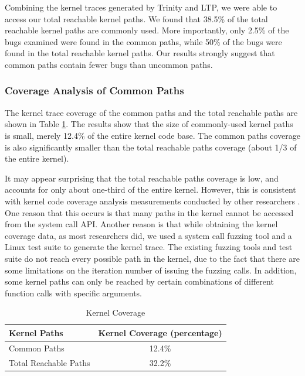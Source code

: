 Combining the kernel traces generated by Trinity and LTP, we were able to
access our total reachable kernel paths.
We found that 38.5\% of the total reachable
kernel paths are commonly used. 
More importantly, only 2.5\% of the bugs examined were found in the common
paths, 
while 50\% of the bugs were found in the total reachable kernel paths. 
Our results strongly suggest that common paths contain fewer bugs than uncommon
paths.  

\subsubsection{Coverage Analysis of Common Paths}

The kernel trace coverage of the common paths and the total reachable paths
are shown in Table \ref{table:kernel_coverage}. 
The results show that the size of commonly-used kernel paths is small,
merely 12.4\% of the entire kernel code base. 
The common paths coverage is also significantly smaller than the total
reachable paths coverage 
(about 1/3 of the entire kernel).

It may appear surprising that the total reachable paths coverage is low, 
and accounts for only about one-third of the entire kernel.  However, 
this is consistent with kernel code coverage analysis 
measurements conducted by other researchers \cite{LTP-Coverage}.
One reason that this occurs is that many paths 
in the kernel cannot be accessed from the system call API. Another reason
is that 
while obtaining the kernel coverage data, as most researchers did, we used
a system call fuzzing tool 
and a Linux test suite to generate the kernel trace. The existing fuzzing
tools and test suite do not reach every possible path in the kernel, due to 
the fact that there are some limitations on the iteration number of issuing  
the fuzzing calls. In addition, some kernel paths can only be reached by 
certain combinations of different function calls with specific arguments. 


\begin{table}
\centering
\scriptsize
\caption {Kernel Coverage}
\begin{tabular}{|l|c|}
  \hline
  \textbf{Kernel Paths} & \textbf{Kernel Coverage (percentage)} \\
  \hline \hline
  Common Paths & 12.4\% \\
  \hline
  Total Reachable Paths & 32.2\% \\
  \hline
\end{tabular}
\label{table:kernel_coverage}
\end{table}

